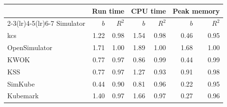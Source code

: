 \begin{tabular}{lrrrrrr}
\toprule
 & \multicolumn{2}{c}{Run time} & \multicolumn{2}{c}{CPU time} & \multicolumn{2}{c}{Peak memory}\\
\cmidrule(lr){2-3}\cmidrule(lr){4-5}\cmidrule(lr){6-7}
Simulator & $b$ & $R^2$ & $b$ & $R^2$ & $b$ & $R^2$\\
\midrule
kcs & 1.22 & 0.98 & 1.54 & 0.98 & 0.46 & 0.95\\
OpenSimulator & 1.71 & 1.00 & 1.89 & 1.00 & 1.68 & 1.00\\
KWOK & 0.77 & 0.97 & 0.86 & 0.99 & 0.44 & 0.99\\
KSS & 0.77 & 0.97 & 1.27 & 0.93 & 0.91 & 0.98\\
SimKube & 0.44 & 0.90 & 0.81 & 0.96 & 0.22 & 0.95\\
Kubemark & 1.40 & 0.97 & 1.66 & 0.97 & 0.27 & 0.96\\
\bottomrule
\end{tabular}
